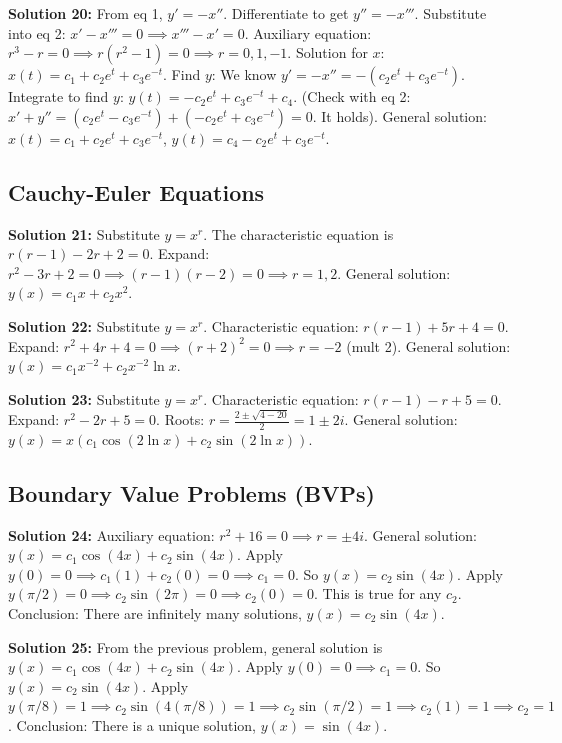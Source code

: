 \documentclass[12pt]{article}
\begin{document}
\textbf{Solution 20:} 
From eq 1, $y' = -x''$. Differentiate to get $y'' = -x'''$. 
Substitute into eq 2: $x' - x''' = 0 \implies x''' - x' = 0$. 
Auxiliary equation: $r^3 - r = 0 \implies r(r^2-1) = 0 \implies r = 0, 1, -1$. 
Solution for $x$: $x(t) = c_1 + c_2e^t + c_3e^{-t}$. 
Find $y$: We know $y' = -x'' = -(c_2e^t + c_3e^{-t})$. 
Integrate to find $y$: $y(t) = -c_2e^t + c_3e^{-t} + c_4$. 
(Check with eq 2: $x' + y'' = (c_2e^t - c_3e^{-t}) + (-c_2e^t + c_3e^{-t}) = 0$. It holds). 
General solution: $x(t) = c_1 + c_2e^t + c_3e^{-t}$, $y(t) = c_4 - c_2e^t + c_3e^{-t}$.

\subsection*{Cauchy-Euler Equations}
\textbf{Solution 21:} 
Substitute $y = x^r$. The characteristic equation is $r(r-1) - 2r + 2 = 0$. 
Expand: $r^2 - 3r + 2 = 0 \implies (r-1)(r-2) = 0 \implies r = 1, 2$. 
General solution: $y(x) = c_1x + c_2x^2$.

\textbf{Solution 22:} 
Substitute $y = x^r$. Characteristic equation: $r(r-1) + 5r + 4 = 0$. 
Expand: $r^2 + 4r + 4 = 0 \implies (r+2)^2 = 0 \implies r = -2$ (mult 2). 
General solution: $y(x) = c_1x^{-2} + c_2x^{-2}\ln x$.

\textbf{Solution 23:} 
Substitute $y = x^r$. Characteristic equation: $r(r-1) - r + 5 = 0$. 
Expand: $r^2 - 2r + 5 = 0$. 
Roots: $r = \frac{2 \pm \sqrt{4-20}}{2} = 1 \pm 2i$. 
General solution: $y(x) = x(c_1\cos(2\ln x) + c_2\sin(2\ln x))$.

\subsection*{Boundary Value Problems (BVPs)}
\textbf{Solution 24:} 
Auxiliary equation: $r^2 + 16 = 0 \implies r = \pm 4i$. 
General solution: $y(x) = c_1\cos(4x) + c_2\sin(4x)$. 
Apply $y(0) = 0 \implies c_1(1) + c_2(0) = 0 \implies c_1 = 0$. 
So $y(x) = c_2\sin(4x)$. 
Apply $y(\pi/2) = 0 \implies c_2\sin(2\pi) = 0 \implies c_2(0) = 0$. 
This is true for any $c_2$. 
Conclusion: There are infinitely many solutions, $y(x) = c_2\sin(4x)$.

\textbf{Solution 25:} 
From the previous problem, general solution is $y(x) = c_1\cos(4x) + c_2\sin(4x)$. 
Apply $y(0) = 0 \implies c_1 = 0$. 
So $y(x) = c_2\sin(4x)$. 
Apply $y(\pi/8) = 1 \implies c_2\sin(4(\pi/8)) = 1 \implies c_2\sin(\pi/2) = 1 \implies c_2(1) = 1 \implies c_2 = 1$. 
Conclusion: There is a unique solution, $y(x) = \sin(4x)$.
\end{document}
